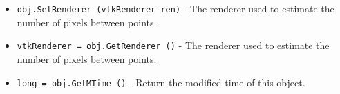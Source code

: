 \begin{itemize}
\item  \verb|obj.SetRenderer (vtkRenderer ren)| -  The renderer used to estimate the number of pixels between
 points.

\item  \verb|vtkRenderer = obj.GetRenderer ()| -  The renderer used to estimate the number of pixels between
 points.

\item  \verb|long = obj.GetMTime ()| -  Return the modified time of this object.

\end{itemize}
